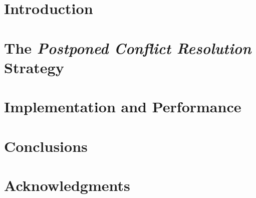 \documentclass{llncs}
\begin{document}
\section{Introduction}


\section{The \textit{Postponed Conflict Resolution} Strategy}
\label{section:ppcrforrr}


%

%

%

\section{Implementation and Performance}
\label{section:ppcrlr}


%

%

%
%


\section{Conclusions}
\label{section:conclusion}


\section*{Acknowledgments}


\begin{thebibliography}{99}

\end{thebibliography}
\end{document}
